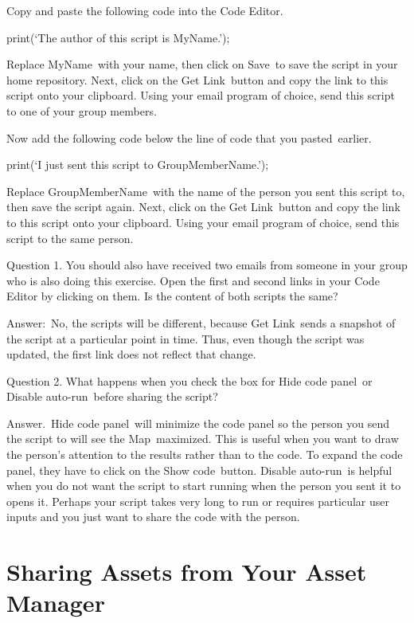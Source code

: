 \documentclass[
  letterpaper,
  DIV=11,
  numbers=noendperiod]{scrreprt}
\begin{document}
Copy and paste the following code into the Code Editor.

print(`The author of this script is MyName.');

Replace MyName~with your name, then click on Save~to save the script in
your home repository. Next, click on the Get Link~button and copy the
link to this script onto your clipboard. Using your email program of
choice, send this script to one of your group members.

Now add the following code below the line of code that you
pasted~earlier.

print(`I just sent this script to GroupMemberName.');

Replace GroupMemberName~with the name of the person you sent this script
to, then save the script again. Next, click on the Get Link~button and
copy the link to this script onto your clipboard. Using your email
program of choice, send this script to the same person.

Question 1. You should also have received two emails from someone in
your group who is also doing this exercise. Open the first and second
links in your Code Editor by clicking on them. Is the content of both
scripts the same?

Answer:~No, the scripts will be different, because Get Link~sends a
snapshot of the script at a particular point in time. Thus, even though
the script was updated, the first link does not reflect that change.

Question 2. What happens when you check the box for Hide code panel~or
Disable auto-run~before sharing the script?

Answer.~Hide code panel~will minimize the code panel so the person you
send the script to will see the Map~maximized. This is useful when you
want to draw the person's attention to the results rather than to the
code. To expand the code panel, they have to click on the Show
code~button. Disable auto-run~is helpful when you do not want the script
to start running when the person you sent it to opens it. Perhaps your
script takes very long to run or requires particular user inputs and you
just want to share the code with the person.

\hypertarget{sharing-assets-from-your-asset-manager}{%
\section{Sharing Assets from Your Asset
Manager}\label{sharing-assets-from-your-asset-manager}}
\end{document}
